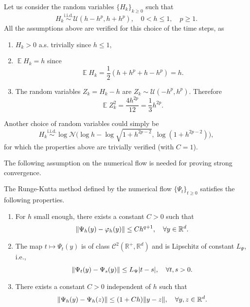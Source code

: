 \documentclass{siamart1116}
\numberwithin{theorem}{section}
\DeclarePairedDelimiter{\abs}{\lvert}{\rvert}
\DeclarePairedDelimiter{\norm}{\|}{\|}
\renewcommand{\phi}{\varphi}
\newcommand{\iid}{\ensuremath{\stackrel{\text{i.i.d.}}{\sim}}}
\newcommand{\R}{\mathbb{R}}
\newcommand{\E}{\operatorname{\mathbb{E}}}
\begin{document}
\begin{example}\label{ex:uniformH} Let us consider the random variables $\{H_k\}_{k\geq 0}$ such that
	\begin{equation}
		H_k \iid \mathcal{U}(h-h^p, h+h^p), \quad 0 < h \leq 1, \quad p \geq 1.
	\end{equation}
	All the assumptions above are verified for this choice of the time steps, as
	\begin{enumerate}
		\item $H_k > 0$ a.s. trivially since $h \leq 1$,
		\item $\E H_k = h$ since 
		\begin{equation}
			\E H_k = \frac{1}{2}(h + h^p + h - h^p) = h.
		\end{equation}
		\item The random variables $Z_k = H_k - h$ are $Z_k \sim \mathcal{U}(-h^p, h^p)$. Therefore
		\begin{equation}
			\E Z_k^2 = \frac{4h^{2p}}{12} = \frac{1}{3}h^{2p}.
		\end{equation}
	\end{enumerate}
	Another choice of random variables could simply be 
	\begin{equation}
		H_k \iid \log\mathcal{N}\big(\log h - \log\sqrt{1 + h^{2p - 2}}, \log(1 + h^{2p-2})\big),
	\end{equation}
	for which the properties above are trivially verified (with $C = 1$).
\end{example}
The following assumption on the numerical flow is needed for proving strong convergence.
\begin{assumption}\label{as:PsiStrong} The Runge-Kutta method defined by the numerical flow $\{\Psi_t\}_{t\geq 0}$ satisfies the following properties.
	\begin{enumerate}
		\item\label{as:PsiStrong_Order} For $h$ small enough, there exists a constant $C > 0$ such that
			\begin{equation}
				\norm{\Psi_h(y) - \phi_h(y)} \leq Ch^{q+1}, \quad \forall y \in \R^d.
			\end{equation}
		\item\label{as:PsiStrong_Time} The map $t \mapsto \Psi_t(y)$ is of class $\mathcal{C}^2(\R^+, \R^d)$ and is Lipschitz of constant $L_\Psi$, i.e., 
			\begin{equation}\label{eq:LipschitzPsiT}
				\norm{\Psi_t(y) - \Psi_s(y)} \leq L_\Psi \abs{t - s}, \quad \forall t, s > 0.
			\end{equation}
		\item\label{as:PsiStrong_Space} There exists a constant $C > 0$ independent of $h$ such that 
			\begin{equation}\label{eq:LipschitzPsiY}
				\norm{\Psi_h(y) - \Psi_h(z)} \leq (1 + Ch) \norm{y - z}, \quad \forall y, z \in \R^d.
			\end{equation}
	\end{enumerate}
\end{assumption}
\end{document}
